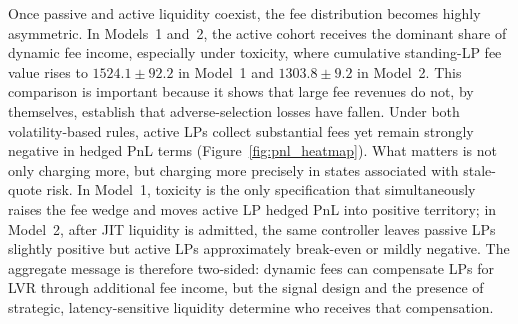 \documentclass[11pt]{article}
\begin{document}
Once passive and active liquidity coexist, the fee distribution becomes highly asymmetric. In Models~1 and~2, the active 
cohort receives the dominant share of dynamic fee income, especially under toxicity, where cumulative standing-LP fee value 
rises to \(1524.1\pm92.2\) in Model~1 and \(1303.8\pm9.2\) in Model~2. This comparison is important because it shows that
large fee revenues do not, by themselves, establish that adverse-selection losses have fallen. Under both volatility-based
rules, active LPs collect substantial fees yet remain strongly negative in hedged PnL terms (Figure~\ref{fig:pnl_heatmap}).
What matters is not only charging more, but charging more precisely in states associated with stale-quote risk. In Model~1,
toxicity is the only specification that simultaneously raises the fee wedge and moves active LP hedged PnL into positive
territory; in Model~2, after JIT liquidity is admitted, the same controller leaves passive LPs slightly positive but active
LPs approximately break-even or mildly negative. The aggregate message is therefore two-sided: dynamic fees can compensate
LPs for LVR through additional fee income, but the signal design and the presence of strategic, latency-sensitive liquidity
determine who receives that compensation.
\end{document}
